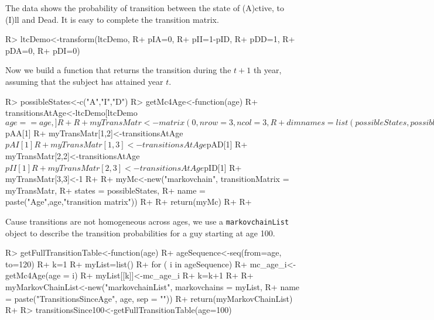 \documentclass[article,nojss]{jss}
\begin{document}
The data shows the probability of transition between the state of (A)ctive, to (I)ll and Dead. It is easy to complete the
transition matrix.

\begin{CodeChunk}

\begin{CodeInput}
R> ltcDemo<-transform(ltcDemo,
R+                    pIA=0,
R+                    pII=1-pID,
R+                    pDD=1,
R+                    pDA=0,
R+                    pDI=0)
\end{CodeInput}
\end{CodeChunk}

Now we build a function that returns the transition during the \(t+1\) th year, assuming that the subject has attained year \(t\).

\begin{CodeChunk}

\begin{CodeInput}
R> possibleStates<-c("A","I","D")
R> getMc4Age<-function(age) {
R+   transitionsAtAge<-ltcDemo[ltcDemo$age==age,]
R+   
R+   myTransMatr<-matrix(0, nrow=3,ncol = 3,
R+                       dimnames = list(possibleStates, possibleStates))
R+   myTransMatr[1,1]<-transitionsAtAge$pAA[1]
R+   myTransMatr[1,2]<-transitionsAtAge$pAI[1]
R+   myTransMatr[1,3]<-transitionsAtAge$pAD[1]
R+   myTransMatr[2,2]<-transitionsAtAge$pII[1]
R+   myTransMatr[2,3]<-transitionsAtAge$pID[1]
R+   myTransMatr[3,3]<-1
R+   
R+   myMc<-new("markovchain", transitionMatrix = myTransMatr,
R+             states = possibleStates,
R+             name = paste("Age",age,"transition matrix"))
R+   
R+   return(myMc)
R+ 
R+ }
\end{CodeInput}
\end{CodeChunk}

Cause transitions are not homogeneous across ages, we use a \texttt{markovchainList} object to describe the transition probabilities for a guy starting at age 100.

\begin{CodeChunk}

\begin{CodeInput}
R> getFullTransitionTable<-function(age){
R+   ageSequence<-seq(from=age, to=120)
R+   k=1
R+   myList=list()
R+   for ( i in ageSequence) {
R+     mc_age_i<-getMc4Age(age = i)
R+     myList[[k]]<-mc_age_i
R+     k=k+1
R+   }
R+   myMarkovChainList<-new("markovchainList", markovchains = myList,
R+                          name = paste("TransitionsSinceAge", age, sep = ""))
R+   return(myMarkovChainList)
R+ }
R> transitionsSince100<-getFullTransitionTable(age=100)
\end{CodeInput}
\end{CodeChunk}
\end{document}
